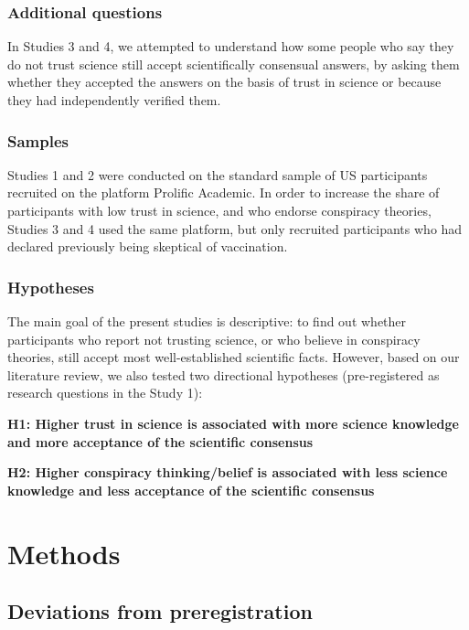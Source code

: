 \documentclass[
  doc,floatsintext]{apa6}
\begin{document}
\subsubsection{Additional questions}\label{additional-questions}

In Studies 3 and 4, we attempted to understand how some people who say they do not trust science still accept scientifically consensual answers, by asking them whether they accepted the answers on the basis of trust in science or because they had independently verified them.

\subsubsection{Samples}\label{samples}

Studies 1 and 2 were conducted on the standard sample of US participants recruited on the platform Prolific Academic. In order to increase the share of participants with low trust in science, and who endorse conspiracy theories, Studies 3 and 4 used the same platform, but only recruited participants who had declared previously being skeptical of vaccination.

\subsubsection{Hypotheses}\label{hypotheses}

The main goal of the present studies is descriptive: to find out whether participants who report not trusting science, or who believe in conspiracy theories, still accept most well-established scientific facts. However, based on our literature review, we also tested two directional hypotheses (pre-registered as research questions in the Study 1):

\textbf{H1: Higher trust in science is associated with more science knowledge and more acceptance of the scientific consensus}

\textbf{H2: Higher conspiracy thinking/belief is associated with less science knowledge and less acceptance of the scientific consensus}

\section{Methods}\label{methods}

\subsection{Deviations from preregistration}\label{deviations-from-preregistration}
\end{document}
